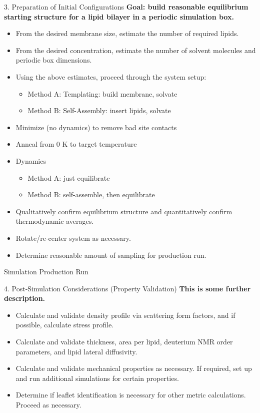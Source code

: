 \documentclass[9pt,bestpractices]{livecoms}
\begin{document}
\begin{Checklists*}[p!]
\begin{checklist}{3. Preparation of Initial Configurations}
\textbf{Goal: build reasonable equilibrium starting structure for a lipid bilayer in a periodic simulation box.}
\begin{itemize}
\item From the desired membrane size, estimate the number of required lipids.
\item From the desired concentration, estimate the number of solvent molecules and periodic box dimensions.
\item Using the above estimates, proceed through the system setup:
	\begin{itemize}
	\item Method A: Templating: build membrane, solvate
	\item Method B: Self-Assembly: insert lipids, solvate
	\end{itemize}
\item Minimize (no dynamics) to remove bad site contacts
\item Anneal from 0 K to target temperature
\item Dynamics
	\begin{itemize}
	\item Method A: just equilibrate
	\item Method B: self-assemble, then equilibrate
	\end{itemize}
\item Qualitatively confirm equilibrium structure and quantitatively confirm thermodynamic averages.
\item Rotate/re-center system as necessary.
\item Determine reasonable amount of sampling for production run.
\end{itemize}
\end{checklist}

\begin{checklist}{Simulation Production Run}
\end{checklist}

\begin{checklist}{4. Post-Simulation Considerations (Property Validation)}
\textbf{This is some further description.}
\begin{itemize}
\item Calculate and validate density profile via scattering form factors, and if possible, calculate stress profile.
\item Calculate and validate thickness, area per lipid, deuterium NMR order parameters, and lipid lateral diffusivity.
\item Calculate and validate mechanical properties as necessary. If required, set up and run additional simulations for certain properties.
\item Determine if leaflet identification is necessary for other metric calculations. Proceed as necessary.
\end{itemize}
\end{checklist}

\end{Checklists*}
\end{document}
